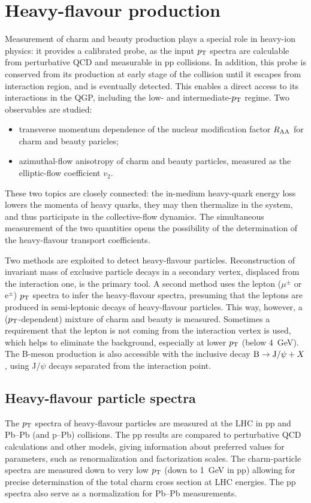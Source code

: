 \section{Heavy-flavour production}
\label{secks:heavy}
 Measurement of charm and beauty production plays a special role in heavy-ion physics: it provides a calibrated probe, as the input $p_{\rm T}$ spectra are calculable from perturbative QCD and measurable in pp collisions. In addition, this probe is conserved from its production at early stage of the collision until it escapes from interaction region, and is eventually detected. This enables a direct access to its interactions in the QGP, including the low- and intermediate-$p_{\rm T}$ regime. Two observables are studied:
 \begin{itemize}
 \item{transverse momentum dependence of the nuclear modification factor $R_{\rm AA}$ for charm and beauty paricles;}
 \item{azimuthal-flow anisotropy of charm and beauty particles, measured as the elliptic-flow coefficient $v_2$.}
 \end{itemize}
 These two topics are closely connected: the in-medium heavy-quark energy loss lowers the momenta of heavy quarks, they may then thermalize in the system, and thus participate in the collective-flow dynamics. The simultaneous measurement of the two quantities opens the possibility of the determination of the heavy-flavour transport coefficients.
 
 Two methods are exploited to detect heavy-flavour particles. Reconstruction of invariant mass of exclusive particle decays in a secondary vertex, displaced from the interaction one, is the primary tool. A second method uses the lepton ($\mu^\pm$ or e$^\pm$) $p_{\rm T}$ spectra to infer the heavy-flavour spectra, presuming that the leptons are produced in semi-leptonic decays of heavy-flavour particles. This way, however, a ($p_{\rm T}$-dependent) mixture of charm and beauty is measured. Sometimes a requirement that the lepton is not coming from the interaction vertex is used, which helps to eliminate the background, especially at lower $p_{\rm T}$ (below 4~GeV). The B-meson production is also accessible with the inclusive decay ${\rm B} \rightarrow {\rm J}/\psi + X$, using J/$\psi$ decays separated from the interaction point.
\subsection{Heavy-flavour particle spectra}
\label{subsecks:heavyspectra}
The $p_{\rm T}$ spectra of heavy-flavour particles are measured at the LHC in pp and Pb--Pb (and p--Pb) collisions. The pp results are compared to perturbative QCD calculations and other models, giving information about preferred values for parameters, such as renormalization and factorization scales. The charm-particle spectra are measured down to very low $p_{\rm T}$ (down to 1~GeV in pp) allowing for precise determination of the total charm cross section at LHC energies. The pp spectra also serve as a normalization for Pb--Pb measurements. 

